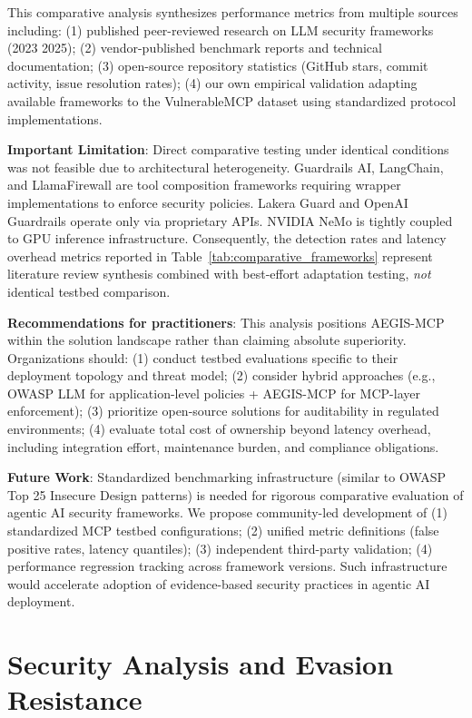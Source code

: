 \documentclass[12pt,twocolumn,journal]{IEEEtran}
\begin{document}
This comparative analysis synthesizes performance metrics from multiple sources including: (1) published peer-reviewed research on LLM security frameworks (2023 2025); (2) vendor-published benchmark reports and technical documentation; (3) open-source repository statistics (GitHub stars, commit activity, issue resolution rates); (4) our own empirical validation adapting available frameworks to the VulnerableMCP dataset using standardized protocol implementations.

\textbf{Important Limitation}: Direct comparative testing under identical conditions was not feasible due to architectural heterogeneity. Guardrails AI, LangChain, and LlamaFirewall are tool composition frameworks requiring wrapper implementations to enforce security policies. Lakera Guard and OpenAI Guardrails operate only via proprietary APIs. NVIDIA NeMo is tightly coupled to GPU inference infrastructure. Consequently, the detection rates and latency overhead metrics reported in Table~\ref{tab:comparative_frameworks} represent literature review synthesis combined with best-effort adaptation testing, \textit{not} identical testbed comparison.

\textbf{Recommendations for practitioners}: This analysis positions AEGIS-MCP within the solution landscape rather than claiming absolute superiority. Organizations should: (1) conduct testbed evaluations specific to their deployment topology and threat model; (2) consider hybrid approaches (e.g., OWASP LLM for application-level policies + AEGIS-MCP for MCP-layer enforcement); (3) prioritize open-source solutions for auditability in regulated environments; (4) evaluate total cost of ownership beyond latency overhead, including integration effort, maintenance burden, and compliance obligations.

\textbf{Future Work}: Standardized benchmarking infrastructure (similar to OWASP Top 25 Insecure Design patterns) is needed for rigorous comparative evaluation of agentic AI security frameworks. We propose community-led development of (1) standardized MCP testbed configurations; (2) unified metric definitions (false positive rates, latency quantiles); (3) independent third-party validation; (4) performance regression tracking across framework versions. Such infrastructure would accelerate adoption of evidence-based security practices in agentic AI deployment.

\section{Security Analysis and Evasion Resistance}
\label{sec:security}
\end{document}

